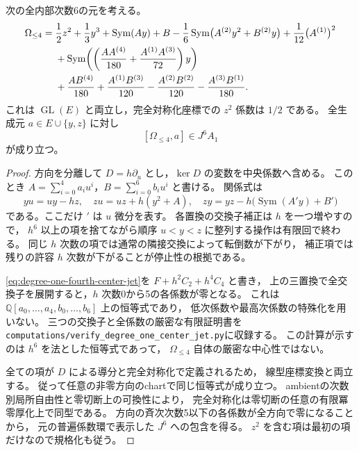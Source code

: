 \begin{lemma}[四次の中心jet]
\label{lem:degree-one-fourth-center-jet}
次の全内部次数6の元を考える。
\begin{align}
 \Omega_{\le4}={}&\frac12z^2+\frac13y^3+\operatorname{Sym}(Ay)+B
   -\frac16\operatorname{Sym}\bigl(A^{(2)}y^2+B^{(2)}y\bigr)
   +\frac1{12}\bigl(A^{(1)}\bigr)^2\notag\\
 &+\operatorname{Sym}\!\left(
       \left(\frac{AA^{(4)}}{180}
                  +\frac{A^{(1)}A^{(3)}}{72}\right)y\right)\notag\\
 &+\frac{AB^{(4)}}{180}
       +\frac{A^{(1)}B^{(3)}}{120}
       -\frac{A^{(2)}B^{(2)}}{120}
       -\frac{A^{(3)}B^{(1)}}{180}.
 \label{eq:degree-one-fourth-center-jet}
\end{align}
これは $\operatorname{GL}(E)$ と両立し，完全対称化座標での
$z^2$ 係数は $1/2$ である。
全生成元 $a\in E\cup\{y,z\}$ に対し
\[
 [\Omega_{\le4},a]\in J^6A_1
\]
が成り立つ。
\end{lemma}
\begin{proof}
方向を分離して $D=h\partial_u$ とし，$\ker D$ の変数を中央係数へ含める。
このとき $A=\sum_{i=0}^4a_i u^i$，$B=\sum_{i=0}^6b_i u^i$ と書ける。
関係式は
\[
 yu=uy-hz,\quad
 zu=uz+h(y^2+A),\quad
 zy=yz-h\bigl(\operatorname{Sym}(A'y)+B'\bigr)
\]
である。ここだけ $'$ は $u$ 微分を表す。
各置換の交換子補正は $h$ を一つ増やすので，
$h^6$ 以上の項を捨てながら順序 $u<y<z$ に整列する操作は有限回で終わる。
同じ $h$ 次数の項では通常の隣接交換によって転倒数が下がり，
補正項では残りの許容 $h$ 次数が下がることが停止性の根拠である。

\eqref{eq:degree-one-fourth-center-jet}を $F+h^2C_2+h^4C_4$ と書き，
上の三置換で全交換子を展開すると，$h$ 次数0から5の各係数が零となる。
これは $\mathbb Q[a_0,\ldots,a_4,b_0,\ldots,b_6]$ 上の恒等式であり，
低次係数や最高次係数の特殊化を用いない。
三つの交換子と全係数の厳密な有限証明書を
\texttt{computations/verify\_degree\_one\_center\_jet.py}に収録する。
この計算が示すのは $h^6$ を法とした恒等式であって，
$\Omega_{\le4}$ 自体の厳密な中心性ではない。

全ての項が $D$ による導分と完全対称化で定義されるため，
線型座標変換と両立する。
従って任意の非零方向のchartで同じ恒等式が成り立つ。
ambientの次数別局所自由性と零切断上の可換性により，
完全対称化は零切断の任意の有限冪零厚化上で同型である。
方向の斉次次数5以下の各係数が全方向で零になることから，
元の普遍係数環で表示した $J^6$ への包含を得る。
$z^2$ を含む項は最初の項だけなので規格化も従う。
\end{proof}

